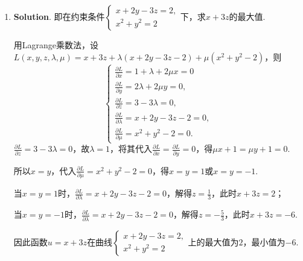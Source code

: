 \documentclass[../main.tex]{subfiles}
\begin{document}
\begin{enumerate}
    \item \textbf{Solution}. 即在约束条件$\begin{cases}
                  x+2y-3z = 2, \\
                  x^{2}+y^{2} = 2
              \end{cases}$下，求$x+3z$的最大值.

          用Lagrange乘数法，设$L(x,y,z,\lambda,\mu) = x+3z + \lambda\left(x+2y-3z-2\right
              ) + \mu\left(x^{2}+y^{2}-2\right)$，则
          \[
              \begin{cases}
                  \frac{\partial L}{\partial x}= 1+\lambda + 2\mu x = 0 \\[6pt]
                  \frac{\partial L}{\partial y}= 2\lambda + 2\mu y = 0, \\[6pt]
                  \frac{\partial L}{\partial z}= 3 - 3\lambda = 0,      \\[6pt]
                  \frac{\partial L}{\partial \lambda}= x+2y-3z-2 = 0,   \\[6pt]
                  \frac{\partial L}{\partial \mu}= x^{2}+y^{2}-2 = 0.
              \end{cases}
          \]
          $\frac{\partial L}{\partial z}= 3 - 3\lambda = 0$，故$\lambda = 1$，将其代入$\frac{\partial
                  L}{\partial x}= \frac{\partial L}{\partial y}= 0$，得$\mu x + 1 =\mu y + 1 =
              0$.

          所以$x=y$，代入$\frac{\partial L}{\partial \mu}= x^{2}+y^{2}-2 = 0$，得$x=y
              =1$或$x=y=-1$.

          当$x=y=1$时，$\frac{\partial L}{\partial \lambda}= x+2y-3z-2 = 0$，解得$z=\frac{1}{3}$，此时$x
              +3z = 2$；

          当$x=y=-1$时，$\frac{\partial L}{\partial \lambda}= x+2y-3z-2 = 0$，解得$z=
              -\frac{5}{3}$，此时$x+3z = -6$.

          因此函数$u=x+3z$在曲线$\begin{cases}
                  x+2y-3z=2, \\
                  x^{2}+y^{2} = 2
              \end{cases}$上的最大值为$2$，最小值为$-6$.


\end{enumerate}
\end{document}
